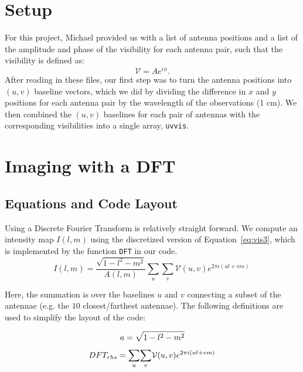 \documentclass[11pt,letterpaper]{article}
\begin{document}
\section{Setup}
For this project, Michael provided us with a list of antenna positions and a 
list of the amplitude and phase of the visibility for each antenna pair, such 
that the visibility is defined as:
\begin{equation}
\mathcal{V}=Ae^{i\phi}.
\end{equation}
After reading in these files, our first step was to turn the antenna positions 
into $(u,v)$ baseline vectors, which we did by dividing the difference in 
$x$ and $y$ positions for each antenna pair by the wavelength of the 
observations (1 cm).  We then combined the $(u,v)$ baselines for 
each pair of antennas with the corresponding visibilities into a 
single array, \texttt{uvvis}.

\section{Imaging with a DFT}

\subsection{Equations and Code Layout}
Using a Discrete Fourier Transform is relatively straight forward. We compute an intensity map $I(l,m)$ using the discretized version of Equation~\ref{eq:vis3}, which is implemented by the function \texttt{DFT} in our code.
\begin{equation}\label{eq:dft1}
I(l,m)= \frac{\sqrt{1-l^2-m^2}}{A(l,m)}\displaystyle\sum\limits_{u}  \! \displaystyle\sum\limits_{v} \! \mathcal{V}(u,v)e^{2\pi i(ul+vm)} \,
\end{equation}

Here, the summation is over the baselines $u$ and $v$ connecting a subset of the antennae (e.g. the $10$ closest/farthest antennae). The following definitions are used to simplify the layout of the code:

\begin{equation}\label{eq:a}
a = \sqrt{1-l^2-m^2} \\
\end{equation}
\begin{equation}\label{eq:rhs}
DFT_{rhs} = \displaystyle\sum\limits_{u}  \! \displaystyle\sum\limits_{v} \! \mathcal{V}(u,v)e^{2\pi i(ul+vm)}\\
\end{equation}
\end{document}
